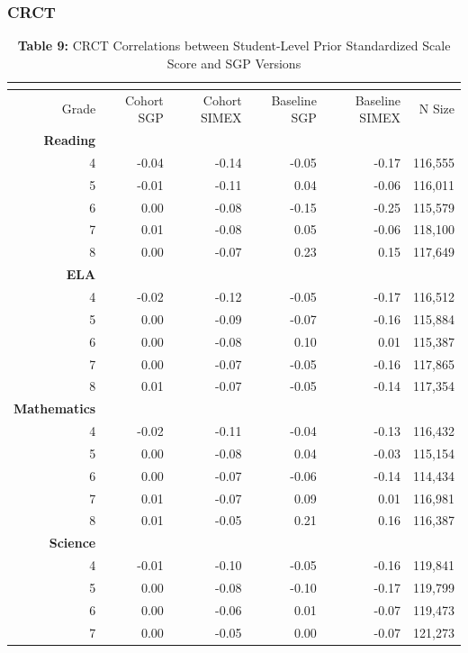 \documentclass[12pt]{article}
\begin{document}
\subsubsection{CRCT}\label{crct}

\begin{table}[!hbtp]
\begin{center}
\begin{normalsize}
\color{black}
\begin{tabular}{rrrrrr}
\multicolumn{6}{c}{\begin{minipage}[c]{0.764705882352941\linewidth}\caption*{\textbf{Table 9:} CRCT Correlations between Student-Level Prior Standardized Scale Score and SGP Versions}\end{minipage}}\\ 
\hline
Grade&Cohort SGP&Cohort SIMEX&Baseline SGP&Baseline SIMEX&N Size\\ 
\hline
\textbf{Reading}&&&&&\\ 
4&-0.04&-0.14&-0.05&-0.17&116,555\\ 
5&-0.01&-0.11& 0.04&-0.06&116,011\\ 
6& 0.00&-0.08&-0.15&-0.25&115,579\\ 
7& 0.01&-0.08& 0.05&-0.06&118,100\\ 
8& 0.00&-0.07& 0.23& 0.15&117,649\\ 
\textbf{ELA}&&&&&\\ 
4&-0.02&-0.12&-0.05&-0.17&116,512\\ 
5& 0.00&-0.09&-0.07&-0.16&115,884\\ 
6& 0.00&-0.08& 0.10& 0.01&115,387\\ 
7& 0.00&-0.07&-0.05&-0.16&117,865\\ 
8& 0.01&-0.07&-0.05&-0.14&117,354\\ 
\textbf{Mathematics}&&&&&\\ 
4&-0.02&-0.11&-0.04&-0.13&116,432\\ 
5& 0.00&-0.08& 0.04&-0.03&115,154\\ 
6& 0.00&-0.07&-0.06&-0.14&114,434\\ 
7& 0.01&-0.07& 0.09& 0.01&116,981\\ 
8& 0.01&-0.05& 0.21& 0.16&116,387\\ 
\textbf{Science}&&&&&\\ 
4&-0.01&-0.10&-0.05&-0.16&119,841\\ 
5& 0.00&-0.08&-0.10&-0.17&119,799\\ 
6& 0.00&-0.06& 0.01&-0.07&119,473\\ 
7& 0.00&-0.05& 0.00&-0.07&121,273\\ 

\end{tabular}
\end{normalsize}
\end{center}
\end{table}
\end{document}
